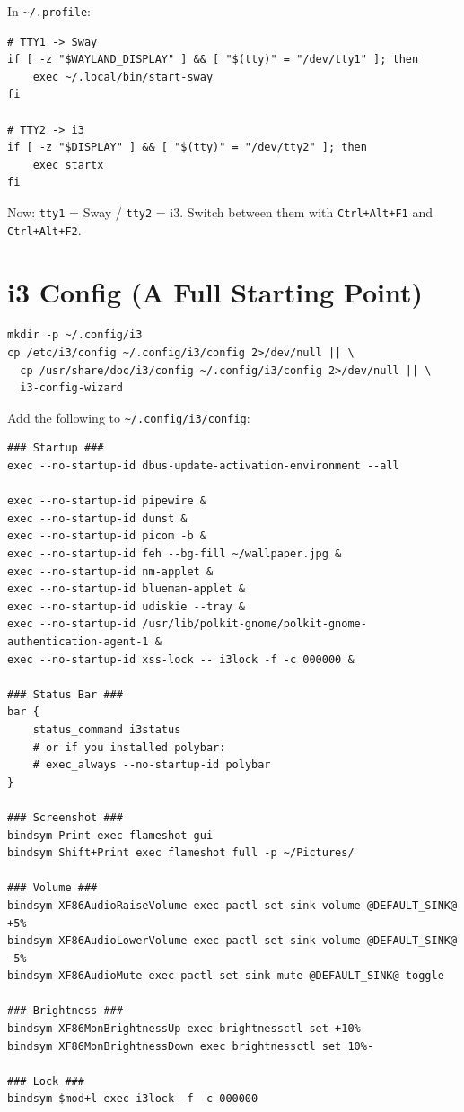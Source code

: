 \documentclass[12pt, a4paper]{book}
\begin{document}
In \texttt{\textasciitilde/.profile}:

\begin{lstlisting}
# TTY1 -> Sway
if [ -z "$WAYLAND_DISPLAY" ] && [ "$(tty)" = "/dev/tty1" ]; then
    exec ~/.local/bin/start-sway
fi

# TTY2 -> i3
if [ -z "$DISPLAY" ] && [ "$(tty)" = "/dev/tty2" ]; then
    exec startx
fi
\end{lstlisting}

Now: \texttt{tty1} = Sway / \texttt{tty2} = i3. Switch between them with \texttt{Ctrl+Alt+F1} and \texttt{Ctrl+Alt+F2}.

\section{i3 Config (A Full Starting Point)}

\begin{lstlisting}
mkdir -p ~/.config/i3
cp /etc/i3/config ~/.config/i3/config 2>/dev/null || \
  cp /usr/share/doc/i3/config ~/.config/i3/config 2>/dev/null || \
  i3-config-wizard
\end{lstlisting}

Add the following to \texttt{\textasciitilde/.config/i3/config}:

\begin{lstlisting}
### Startup ###
exec --no-startup-id dbus-update-activation-environment --all

exec --no-startup-id pipewire &
exec --no-startup-id dunst &
exec --no-startup-id picom -b &
exec --no-startup-id feh --bg-fill ~/wallpaper.jpg &
exec --no-startup-id nm-applet &
exec --no-startup-id blueman-applet &
exec --no-startup-id udiskie --tray &
exec --no-startup-id /usr/lib/polkit-gnome/polkit-gnome-authentication-agent-1 &
exec --no-startup-id xss-lock -- i3lock -f -c 000000 &

### Status Bar ###
bar {
    status_command i3status
    # or if you installed polybar:
    # exec_always --no-startup-id polybar
}

### Screenshot ###
bindsym Print exec flameshot gui
bindsym Shift+Print exec flameshot full -p ~/Pictures/

### Volume ###
bindsym XF86AudioRaiseVolume exec pactl set-sink-volume @DEFAULT_SINK@ +5%
bindsym XF86AudioLowerVolume exec pactl set-sink-volume @DEFAULT_SINK@ -5%
bindsym XF86AudioMute exec pactl set-sink-mute @DEFAULT_SINK@ toggle

### Brightness ###
bindsym XF86MonBrightnessUp exec brightnessctl set +10%
bindsym XF86MonBrightnessDown exec brightnessctl set 10%-

### Lock ###
bindsym $mod+l exec i3lock -f -c 000000
\end{lstlisting}
\end{document}
